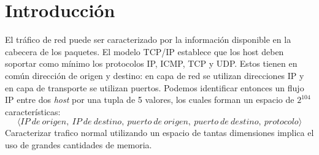 \documentclass[a4paper,10pt, oneside]{book}
\begin{document}
\section*{Introducción}
El tráfico de red puede ser caracterizado por la información disponible en la cabecera de los paquetes. El modelo TCP/IP establece que los host deben soportar como mínimo los protocolos IP, ICMP, TCP y UDP\cite{rfc1122}. Estos tienen en común dirección de origen y destino: en capa de red se utilizan direcciones IP\cite{rfc791} y en capa de transporte se utilizan puertos\cite{rfc768}\cite{rfc793}. Podemos identificar entonces un flujo IP entre dos \textit{host} por una tupla de 5 valores, los cuales forman un espacio de $2^{104}$ características:
\[\langle IP\ de\ origen,\ IP\ de\ destino,\ puerto\ de\ origen,\ puerto\ de\ destino,\ protocolo \rangle\]
Caracterizar trafico normal utilizando un espacio de tantas dimensiones implica el uso de grandes cantidades de memoria.



\nocite{*}
\printbibliography
\end{document}
